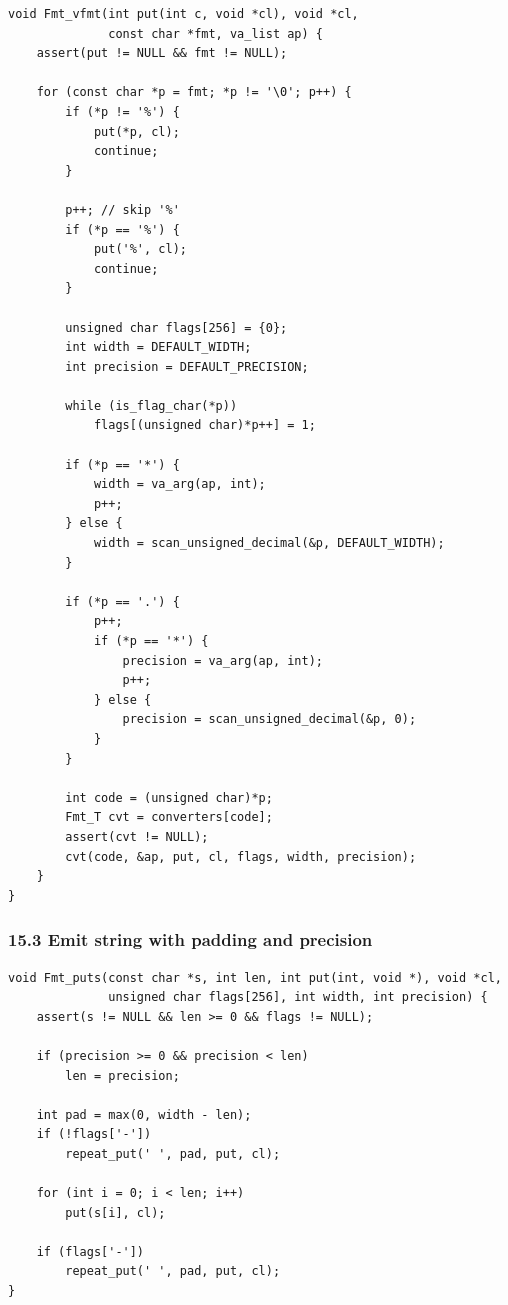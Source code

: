 \documentclass[11pt]{article}
\begin{document}
\begin{verbatim}
void Fmt_vfmt(int put(int c, void *cl), void *cl,
              const char *fmt, va_list ap) {
    assert(put != NULL && fmt != NULL);

    for (const char *p = fmt; *p != '\0'; p++) {
        if (*p != '%') {
            put(*p, cl);
            continue;
        }

        p++; // skip '%'
        if (*p == '%') {
            put('%', cl);
            continue;
        }

        unsigned char flags[256] = {0};
        int width = DEFAULT_WIDTH;
        int precision = DEFAULT_PRECISION;

        while (is_flag_char(*p))
            flags[(unsigned char)*p++] = 1;

        if (*p == '*') {
            width = va_arg(ap, int);
            p++;
        } else {
            width = scan_unsigned_decimal(&p, DEFAULT_WIDTH);
        }

        if (*p == '.') {
            p++;
            if (*p == '*') {
                precision = va_arg(ap, int);
                p++;
            } else {
                precision = scan_unsigned_decimal(&p, 0);
            }
        }

        int code = (unsigned char)*p;
        Fmt_T cvt = converters[code];
        assert(cvt != NULL);
        cvt(code, &ap, put, cl, flags, width, precision);
    }
}
\end{verbatim}

\subsubsection{15.3 Emit string with padding and precision}\label{emit-string-with-padding-and-precision}

\begin{verbatim}
void Fmt_puts(const char *s, int len, int put(int, void *), void *cl,
              unsigned char flags[256], int width, int precision) {
    assert(s != NULL && len >= 0 && flags != NULL);

    if (precision >= 0 && precision < len)
        len = precision;

    int pad = max(0, width - len);
    if (!flags['-'])
        repeat_put(' ', pad, put, cl);

    for (int i = 0; i < len; i++)
        put(s[i], cl);

    if (flags['-'])
        repeat_put(' ', pad, put, cl);
}
\end{verbatim}
\end{document}
